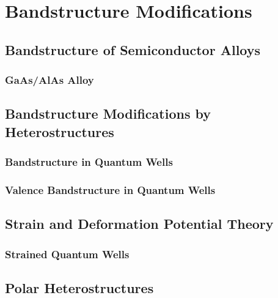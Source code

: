 \chapter{Bandstructure Modifications}

\section{Bandstructure of Semiconductor Alloys}
\subsection{GaAs/AlAs Alloy}
\section{Bandstructure Modifications by Heterostructures}
\subsection{Bandstructure in Quantum Wells}
\subsection{Valence Bandstructure in Quantum Wells}
\section{Strain and Deformation Potential Theory}
\subsection{Strained Quantum Wells}
\section{Polar Heterostructures}